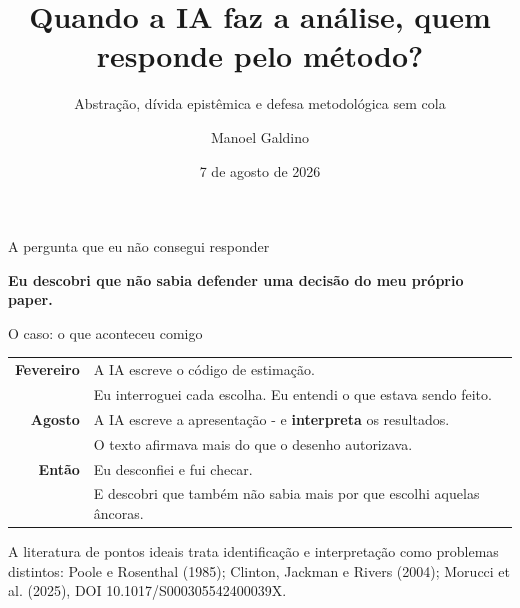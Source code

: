 \documentclass[
  12pt,
  ignorenonframetext,
  aspectratio=169]{beamer}
\title{Quando a IA faz a análise, quem responde pelo método?}
\subtitle{Abstração, dívida epistêmica e defesa metodológica sem cola}
\author{Manoel Galdino}
\date{7 de agosto de 2026}
\begin{document}
\frame{\titlepage}

\begin{frame}{A pergunta que eu não consegui responder}
\protect{}\label{a-pergunta-que-eu-nuxe3o-consegui-responder}
\begin{center}
\vspace{0.6cm}
{\color{orange}\Huge\textbf{Eu descobri que não sabia defender uma decisão do meu próprio paper.}}

\vspace{0.8cm}
\end{center}
\end{frame}

\begin{frame}{O caso: o que aconteceu comigo}
\protect{}\label{o-caso-o-que-aconteceu-comigo}
\begin{center}
\vspace{0.35cm}
\large
\begin{tabular}{r@{\quad}l}
{\color{teal}\textbf{Fevereiro}} & A IA escreve o código de estimação. \\
 & \small Eu interroguei cada escolha. Eu entendi o que estava sendo feito. \\[0.4cm]
{\color{orange}\textbf{Agosto}} & A IA escreve a apresentação - e \textbf{interpreta} os resultados. \\
 & \small O texto afirmava mais do que o desenho autorizava. \\[0.4cm]
{\color{orange}\textbf{Então}} & Eu desconfiei e fui checar. \\
 & \small E descobri que também não sabia mais por que escolhi aquelas âncoras.
\end{tabular}
\end{center}

\vfill{\tiny\color{muted}A literatura de pontos ideais trata identificação e interpretação como problemas distintos: Poole e Rosenthal (1985); Clinton, Jackman e Rivers (2004); Morucci et al. (2025), DOI 10.1017/S000305542400039X.}
\end{frame}
\end{document}

